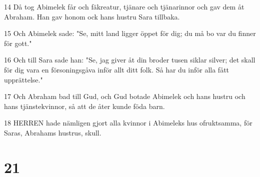 \par 14 Då tog Abimelek får och fäkreatur, tjänare och tjänarinnor och gav dem åt Abraham. Han gav honom ock hans hustru Sara tillbaka.
\par 15 Och Abimelek sade: "Se, mitt land ligger öppet för dig; du må bo var du finner för gott."
\par 16 Och till Sara sade han: "Se, jag giver åt din broder tusen siklar silver; det skall för dig vara en försoningsgåva inför allt ditt folk. Så har du inför alla fått upprättelse."
\par 17 Och Abraham bad till Gud, och Gud botade Abimelek och hans hustru och hans tjänstekvinnor, så att de åter kunde föda barn.
\par 18 HERREN hade nämligen gjort alla kvinnor i Abimeleks hus ofruktsamma, för Saras, Abrahams hustrus, skull.

\chapter{21}

